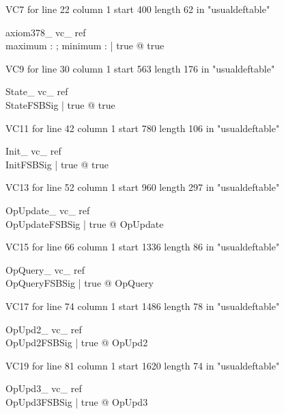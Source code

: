 \documentclass{article}
\begin{document}
VC7 for line 22 column 1 start 400 length 62 in "usualdeftable"
\begin{theorem}{ axiom378\_ vc\_ ref}\\
 \exists maximum : \nat ; minimum : \nat | true @ true \\

\end{theorem}

VC9 for line 30 column 1 start 563 length 176 in "usualdeftable"
\begin{theorem}{ State\_ vc\_ ref}\\
 \exists StateFSBSig | true @ true \\

\end{theorem}

VC11 for line 42 column 1 start 780 length 106 in "usualdeftable"
\begin{theorem}{ Init\_ vc\_ ref}\\
 \exists InitFSBSig | true @ true \\

\end{theorem}

VC13 for line 52 column 1 start 960 length 297 in "usualdeftable"
\begin{theorem}{ OpUpdate\_ vc\_ ref}\\
 \forall OpUpdateFSBSig | true @ \pre OpUpdate \\

\end{theorem}

VC15 for line 66 column 1 start 1336 length 86 in "usualdeftable"
\begin{theorem}{ OpQuery\_ vc\_ ref}\\
 \forall OpQueryFSBSig | true @ \pre OpQuery \\

\end{theorem}

VC17 for line 74 column 1 start 1486 length 78 in "usualdeftable"
\begin{theorem}{ OpUpd2\_ vc\_ ref}\\
 \forall OpUpd2FSBSig | true @ \pre OpUpd2 \\

\end{theorem}

VC19 for line 81 column 1 start 1620 length 74 in "usualdeftable"
\begin{theorem}{ OpUpd3\_ vc\_ ref}\\
 \forall OpUpd3FSBSig | true @ \pre OpUpd3 \\

\end{theorem}
\end{document}
